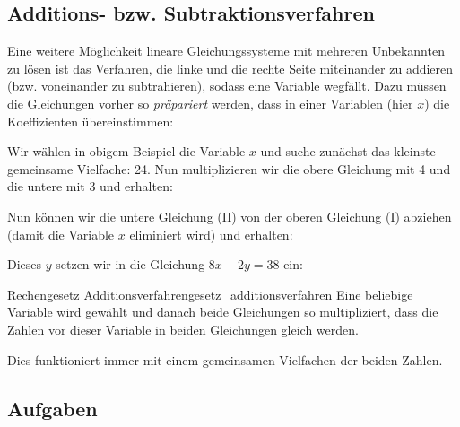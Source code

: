 
\subsection{Additions- bzw. Subtraktionsverfahren}
Eine weitere Möglichkeit lineare Gleichungssysteme mit mehreren Unbekannten zu lösen ist das Verfahren, die linke und die rechte Seite miteinander zu addieren (bzw. voneinander zu subtrahieren), sodass eine Variable wegfällt. Dazu müssen die Gleichungen vorher so \textit{präpariert} werden, dass in einer Variablen (hier \zB $x$) die Koeffizienten übereinstimmen:


Wir wählen \zB in obigem Beispiel die Variable $x$ und suche zunächst
das kleinste gemeinsame Vielfache: 24. Nun multiplizieren wir die obere
Gleichung mit 4 und die untere mit 3 und erhalten:



Nun können wir die untere Gleichung (II) von der oberen Gleichung (I) abziehen (damit die Variable $x$ eliminiert wird)
und erhalten:
  


  Dieses $y$ setzen wir \zB in die Gleichung $8x-2y=38$ ein:
\newpage


  \begin{rezept}{Rechengesetz Additionsverfahren}{gesetz_additionsverfahren}
    Eine beliebige Variable wird gewählt und danach beide Gleichungen so multipliziert,
    dass die Zahlen vor dieser Variable in beiden Gleichungen gleich werden.

    Dies funktioniert
    immer mit einem gemeinsamen Vielfachen der beiden Zahlen.
  \end{rezept}

\subsection*{Aufgaben}
\newpage
